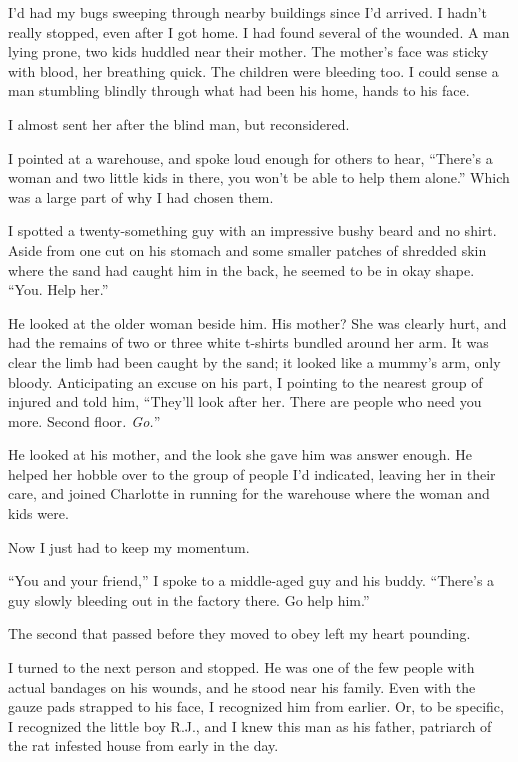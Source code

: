 I'd had my bugs sweeping through nearby buildings since I'd arrived.  I hadn't really stopped, even after I got home.  I had found several of the wounded.  A man lying prone, two kids huddled near their mother.  The mother's face was sticky with blood, her breathing quick.  The children were bleeding too.  I could sense a man stumbling blindly through what had been his home, hands to his face.



I almost sent her after the blind man, but reconsidered.



I pointed at a warehouse, and spoke loud enough for others to hear, ``There's a woman and two little kids in there, you won't be able to help them alone.''  Which was a large part of why I had chosen them.



I spotted a twenty-something guy with an impressive bushy beard and no shirt.  Aside from one cut on his stomach and some smaller patches of shredded skin where the sand had caught him in the back, he seemed to be in okay shape.  ``You.  Help her.''



He looked at the older woman beside him.  His mother?  She was clearly hurt, and had the remains of two or three white t-shirts bundled around her arm.  It was clear the limb had been caught by the sand; it looked like a mummy's arm, only bloody.  Anticipating an excuse on his part, I pointing to the nearest group of injured and told him, ``They'll look after her.  There are people who need you more.  Second floor\emph{.  Go.}''



He looked at his mother, and the look she gave him was answer enough.  He helped her hobble over to the group of people I'd indicated, leaving her in their care, and joined Charlotte in running for the warehouse where the woman and kids were.



Now I just had to keep my momentum.



``You and your friend,'' I spoke to a middle-aged guy and his buddy.  ``There's a guy slowly bleeding out in the factory there.  Go help him.''



The second that passed before they moved to obey left my heart pounding.



I turned to the next person and stopped.  He was one of the few people with actual bandages on his wounds, and he stood near his family.  Even with the gauze pads strapped to his face, I recognized him from earlier.  Or, to be specific, I recognized the little boy R.J., and I knew this man as his father, patriarch of the rat infested house from early in the day.



